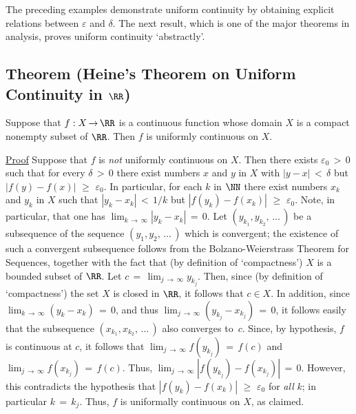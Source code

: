 {\V
\V

        The preceding examples demonstrate uniform continuity by obtaining explicit relations between ${\varepsilon}$ and ${\delta}$.
    The next result, which is one of the major theorems in analysis, proves uniform continuity `abstractly'.

\V


             \subsection{\small{\bf Theorem} (Heine's Theorem on Uniform Continuity in ${\RR}$)}
            \label{ThmD60.40}

        Suppose that $f:X \,{\rightarrow}\, {\RR}$ is a continuous function whose domain $X$ is a compact nonempty subset of ${\RR}$.
    Then $f$ is uniformly continuous on $X$.

\V

        \underline{Proof} Suppose that $f$ is {\em not} uniformly continuous on $X$.
    Then there exists ${\varepsilon}_{0}\,>\,0$ such that for every ${\delta}\,>\,0$ there exist numbers $x$ and $y$ in $X$
    with $|y-x|\,<\,{\delta}$ but $|f(y)-f(x)|\,\,{\geq}\,\,{\varepsilon}_{0}$.
    In particular, for each $k$ in ${\NN}$ there exist numbers $x_{k}$ and $y_{k}$ in $X$
    such that $|y_{k}-x_{k}|\,<\,1/k$ but $|f(y_{k})-f(x_{k})|\,\,{\geq}\,\,{\varepsilon}_{0}$.
    Note, in particular, that one has $\lim_{k \,{\rightarrow}\, {\infty}} |y_{k}-x_{k}| \,=\, 0$.
    Let $(y_{k_{1}}, y_{k_{2}},\,{\ldots}\,)$ be a subsequence of the sequence $(y_{1},y_{2},\,{\ldots}\,)$ which is convergent;
    the existence of such a convergent subsequence follows from the Bolzano-Weierstrass Theorem for Sequences,
    together with the fact that (by definition of `compactness') $X$ is a bounded subset of ${\RR}$.
    Let $c \,=\, \lim_{j \,{\rightarrow}\, {\infty}} y_{k_{j}}$. Then, since (by definition of `compactness') the set $X$ is closed in ${\RR}$, it follows that $c{\in}X$.
    In addition, since $\lim_{k \,{\rightarrow}\, {\infty}} (y_{k}-x_{k}) \,=\, 0$,
    and thus $\lim_{j \,{\rightarrow}\, {\infty}} (y_{k_{j}}-x_{k_{j}}) \,=\, 0$,
    it follows easily that the subsequence $(x_{k_{1}},x_{k_{2}},\,{\ldots}\,)$ also converges to~$c$.
    Since, by hypothesis, $f$ is continuous at $c$, it follows that $\lim_{j \,{\rightarrow}\, {\infty}} f(y_{k_{j}}) \,=\, f(c)$ and $\lim_{j \,{\rightarrow}\, {\infty}} f(x_{k_{j}}) \,=\, f(c)$.
    Thus, $\lim_{j \,{\rightarrow}\, {\infty}} |f(y_{k_{j}}) - f(x_{k_{j}})| \,=\, 0$.
    However, this contradicts the hypothesis that $|f(y_{k})-f(x_{k})|\,\,{\geq}\,\,{\varepsilon}_{0}$ for {\em all} $k$; in particular $k \,=\, k_{j}$.
    Thus, $f$ is uniformally continuous on $X$, as claimed.

}

